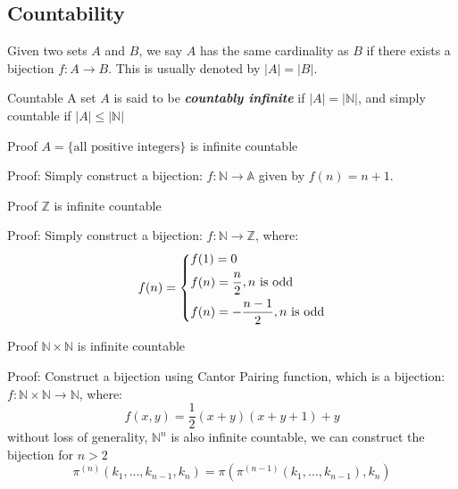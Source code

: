 \subsection{Countability}

\begin{Definition}{}{}
	Given two sets $A$ and $B$, we say $A$ has the same cardinality as $B$ if there exists a bijection $f : A \to B$. This is usually denoted by $|A| = |B|$.
\end{Definition}

\begin{Definition}{Countable}{}
	A set $A$ is said to be {\bfseries \itshape countably infinite } if $|A| = |\mathbb{N}|$, and simply countable if $|A| \leqslant |\mathbb{N}|$
\end{Definition}

\begin{Example}{}{}
	Proof $A = \{ \text{all positive integers} \}$ is infinite countable
\end{Example}
Proof: Simply construct a bijection: $f: \mathbb{N} \to \mathbb{A}$ given by $f(n) = n + 1$.

\begin{Example}{}{}
	Proof $\mathbb{Z}$ is infinite countable
\end{Example}
Proof: Simply construct a bijection: $f: \mathbb{N} \to \mathbb{Z}$, where:
\[
	f(n) = \begin{dcases}
		f(1) = 0                              \\
		f(n) = \dfrac{n}{2}, n \text{ is odd} \\
		f(n) = -\dfrac{n - 1}{2}, n \text{ is odd}
	\end{dcases}
\]

\begin{Example}{}{}
	Proof $\mathbb{N} \times \mathbb{N}$ is infinite countable
\end{Example}
Proof: Construct a bijection using Cantor Pairing function,
which is a bijection: $f: \mathbb{N} \times \mathbb{N} \to \mathbb{N}$, where:
\[ f(x, y) = \dfrac{1}{2} (x + y)(x + y + 1) + y \]
without loss of generality, $\mathbb{N}^n$ is also infinite countable,
we can construct the bijection for $n > 2$
\[ \pi^{(n)} (k_{1},\ldots ,k_{n-1},k_{n}) = \pi (\pi^{(n-1)} (k_{1}, \ldots, k_{n-1}), k_{n}) \]